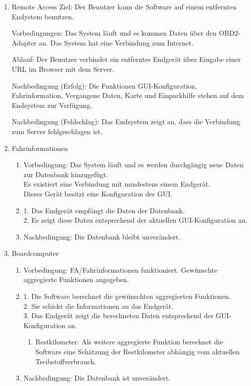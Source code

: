 \documentclass[pflichtenheft.tex]{subfiles}
\begin{document}
\begin{enumerate}
	\item{Remote Access}
		Ziel: Der Benutzer kann die Software auf einem entfernten Endystem benutzen.

		Vorbedingungen: Das System läuft und es kommen Daten über den OBD2-Adapter an. Das System hat eine Verbindung zum Internet.

		Ablauf: Der Benutzer verbindet ein entferntes Endgerät über Eingabe einer URL im Browser mit dem Server.

		Nachbedingung (Erfolg): Die Funktionen GUI-Konfiguration, Fahrinformation, Vergangene Daten, Karte und Einparkhilfe stehen auf dem Endsystem zur Verfügung.

		Nachbedingung (Fehlschlag): Das Endsystem zeigt an, dass die Verbindung zum Server fehlgeschlagen ist.

	\item{Fahrinformationen}
	\begin{enumerate}
		\item Vorbedingung: Das System läuft und es werden durchgängig neue Daten zur Datenbank hinzugefügt.\\ Es existiert eine Verbindung mit mindestens einem Endgerät.\\ Dieses Gerät besitzt eine Konfiguration des GUI.
		\item 1. Das Endgerät empfängt die Daten der Datenbank.\\
		2. Es zeigt diese Daten entsprechend der aktuellen GUI-Konfiguration an.
		\item Nachbedingung: Die Datenbank bleibt unverändert.
	\end{enumerate}

	\item{Boardcomputer} 
	\begin{enumerate} 
		\item Vorbedingung: FA/Fahrinformationen funktioniert. Gewünschte aggregierte Funktionen angegeben.
		\item 1. Die Software berechnet die gewünschten aggregierten Funktionen.\\
		2. Sie schickt die Informationen an das Endgerät.\\
		3. Das Endgerät zeigt die berechneten Daten entsprechend der GUI-Konfiguration an.
		\begin{enumerate}
			\item Restkilometer: Als weitere aggregierte Funktion berechnet die Software eine Schätzung der Restkilometer abhängig vom aktuellen Treibstoffverbrauch.
		\end{enumerate}
		\item Nachbedingung: Die Datenbank ist unverändert.
	\end{enumerate}


\end{enumerate}
\end{document}
